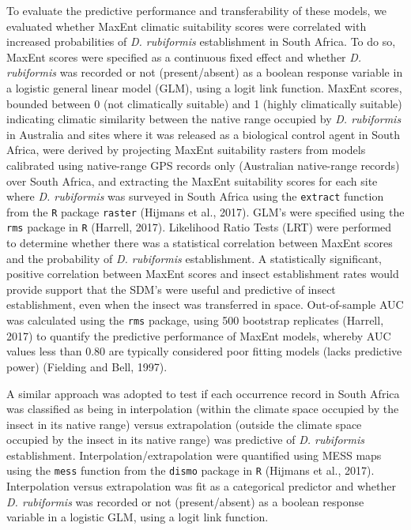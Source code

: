 \documentclass[12pt,]{article}
\begin{document}
To evaluate the predictive performance and transferability of these
models, we evaluated whether MaxEnt climatic suitability scores were
correlated with increased probabilities of \emph{D. rubiformis}
establishment in South Africa. To do so, MaxEnt scores were specified as
a continuous fixed effect and whether \emph{D. rubiformis} was recorded
or not (present/absent) as a boolean response variable in a logistic
general linear model (GLM), using a logit link function. MaxEnt scores,
bounded between 0 (not climatically suitable) and 1 (highly climatically
suitable) indicating climatic similarity between the native range
occupied by \emph{D. rubiformis} in Australia and sites where it was
released as a biological control agent in South Africa, were derived by
projecting MaxEnt suitability rasters from models calibrated using
native-range GPS records only (Australian native-range records) over
South Africa, and extracting the MaxEnt suitability scores for each site
where \emph{D. rubiformis} was surveyed in South Africa using the
\texttt{extract} function from the \texttt{R} package \texttt{raster}
(Hijmans et al., 2017). GLM's were specified using the \texttt{rms}
package in \texttt{R} (Harrell, 2017). Likelihood Ratio Tests (LRT) were
performed to determine whether there was a statistical correlation
between MaxEnt scores and the probability of \emph{D. rubiformis}
establishment. A statistically significant, positive correlation between
MaxEnt scores and insect establishment rates would provide support that
the SDM's were useful and predictive of insect establishment, even when
the insect was transferred in space. Out-of-sample AUC was calculated
using the \texttt{rms} package, using 500 bootstrap replicates (Harrell,
2017) to quantify the predictive performance of MaxEnt models, whereby
AUC values less than 0.80 are typically considered poor fitting models
(lacks predictive power) (Fielding and Bell, 1997).

A similar approach was adopted to test if each occurrence record in
South Africa was classified as being in interpolation (within the
climate space occupied by the insect in its native range) versus
extrapolation (outside the climate space occupied by the insect in its
native range) was predictive of \emph{D. rubiformis} establishment.
Interpolation/extrapolation were quantified using MESS maps using the
\texttt{mess} function from the \texttt{dismo} package in \texttt{R}
(Hijmans et al., 2017). Interpolation versus extrapolation was fit as a
categorical predictor and whether \emph{D. rubiformis} was recorded or
not (present/absent) as a boolean response variable in a logistic GLM,
using a logit link function.
\end{document}
